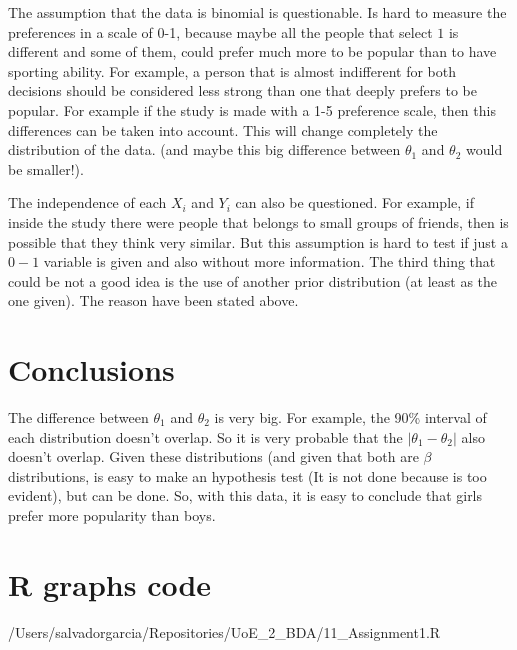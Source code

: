 \documentclass{article}
\begin{document}
The assumption that the data is binomial is questionable. Is hard to measure the preferences in a scale of 0-1, because maybe all the people that select $1$ is different and some of them, could prefer much more to be popular than to have sporting ability. For example, a person that is almost indifferent for both decisions should be considered less strong than one that deeply prefers to be popular. For example if the study is made with a 1-5 preference scale, then this differences can be taken into account. This will change completely the distribution of the data. (and maybe this big difference between $\theta_1$ and $\theta_2$ would be smaller!).

\newpage
The independence of each $X_i$ and $Y_i$ can also be questioned. For example, if inside the study there were people that belongs to small groups of friends, then is possible that they think very similar. But this assumption is hard to test if just a $0-1$ variable is given and also without more information. The third thing that could be not a good idea is the use of another prior distribution (at least as the one given). The reason have been stated above.

\section{Conclusions}	

The difference between $\theta_1$ and $\theta_2$ is very big. For example, the 90\% interval of each distribution doesn't overlap. So it is very probable that the $|\theta_1 - \theta_2|$ also doesn't overlap. Given these distributions (and given that both are $\beta$ distributions, is easy to make an hypothesis test (It is not done because is too evident), but can be done. So, with this data, it is easy to conclude that girls prefer more popularity than boys.

\newpage
\appendix

\section{R graphs code}


{/Users/salvadorgarcia/Repositories/UoE_2_BDA/11_Assignment1.R}
\end{document}

